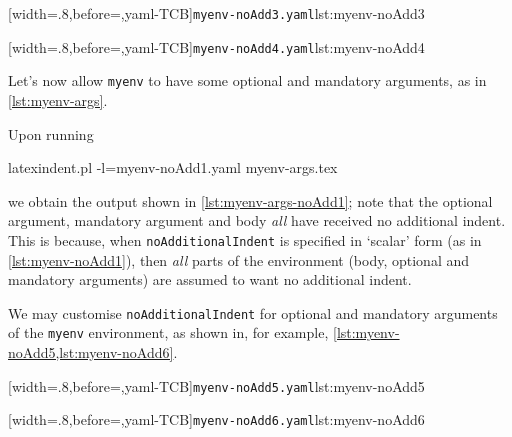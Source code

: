 	\begin{minipage}{.45\textwidth}
		[width=.8\linewidth,before=\centering,yaml-TCB]{\texttt{myenv-noAdd3.yaml}}{lst:myenv-noAdd3}
	\end{minipage}
	\hfill
	\begin{minipage}{.45\textwidth}
		[width=.8\linewidth,before=\centering,yaml-TCB]{\texttt{myenv-noAdd4.yaml}}{lst:myenv-noAdd4}
	\end{minipage}


	Let's now allow \texttt{myenv} to have some optional and mandatory arguments, as in
	\cref{lst:myenv-args}.


	Upon running 
	\begin{commandshell}
latexindent.pl -l=myenv-noAdd1.yaml myenv-args.tex  
\end{commandshell}
	we obtain the output shown in \cref{lst:myenv-args-noAdd1}; note that the optional
	argument, mandatory argument and body \emph{all} have received no additional indent. This
	is because, when \texttt{noAdditionalIndent} is specified in `scalar' form (as in
	\cref{lst:myenv-noAdd1}), then \emph{all} parts of the environment (body, optional and
	mandatory arguments) are assumed to want no additional indent.

	We may customise \texttt{noAdditionalIndent} for optional and mandatory arguments of the
	\texttt{myenv} environment, as shown in, for example,
	\cref{lst:myenv-noAdd5,lst:myenv-noAdd6}.

	\begin{minipage}{.49\textwidth}
		[width=.8\linewidth,before=\centering,yaml-TCB]{\texttt{myenv-noAdd5.yaml}}{lst:myenv-noAdd5}
	\end{minipage}
	\hfill
	\begin{minipage}{.49\textwidth}
		[width=.8\linewidth,before=\centering,yaml-TCB]{\texttt{myenv-noAdd6.yaml}}{lst:myenv-noAdd6}
	\end{minipage}

